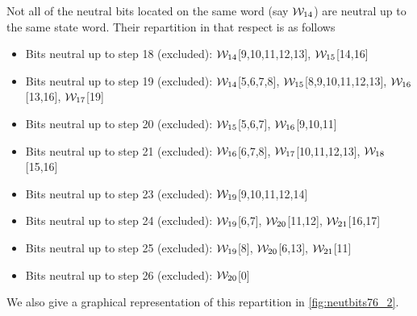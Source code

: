 Not all of the neutral bits located on the same word (say $\mathcal{W}_{14}$) are neutral up to the same state word. Their repartition
in that respect is as follows
\begin{itemize}
	\item Bits neutral up to step 18 (excluded): $\mathcal{W}_{14}$[9,10,11,12,13], $\mathcal{W}_{15}$[14,16]
	\item Bits neutral up to step 19 (excluded): $\mathcal{W}_{14}$[5,6,7,8], $\mathcal{W}_{15}$[8,9,10,11,12,13], $\mathcal{W}_{16}$[13,16], $\mathcal{W}_{17}$[19]
	\item Bits neutral up to step 20 (excluded): $\mathcal{W}_{15}$[5,6,7], $\mathcal{W}_{16}$[9,10,11]
	\item Bits neutral up to step 21 (excluded): $\mathcal{W}_{16}$[6,7,8], $\mathcal{W}_{17}$[10,11,12,13], $\mathcal{W}_{18}$[15,16]
	\item Bits neutral up to step 23 (excluded): $\mathcal{W}_{19}$[9,10,11,12,14]
	\item Bits neutral up to step 24 (excluded): $\mathcal{W}_{19}$[6,7], $\mathcal{W}_{20}$[11,12], $\mathcal{W}_{21}$[16,17]
	\item Bits neutral up to step 25 (excluded): $\mathcal{W}_{19}$[8], $\mathcal{W}_{20}$[6,13], $\mathcal{W}_{21}$[11]
	\item Bits neutral up to step 26 (excluded): $\mathcal{W}_{20}$[0]
\end{itemize}
We also give a graphical representation of this repartition in \autoref{fig:neutbits76_2}.

